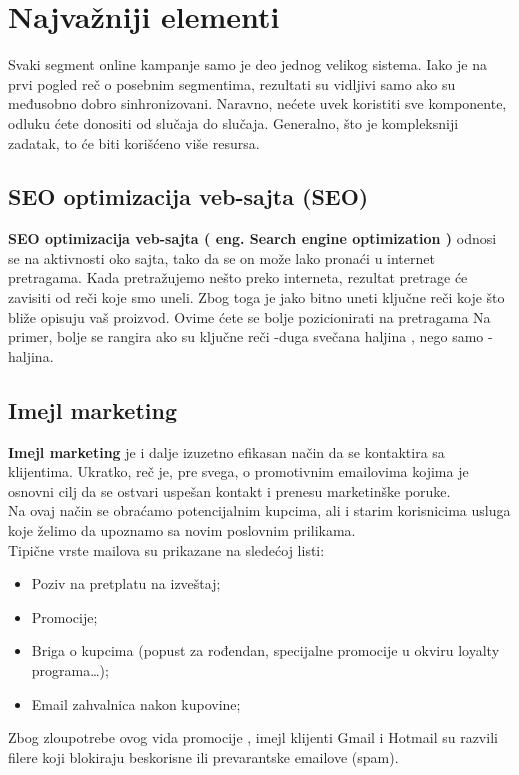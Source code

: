 \documentclass[a4paper]{article}
\begin{document}
{\section{Najvažniji elementi}
\label{sec:najvažniji elementi}
Svaki segment online kampanje samo je deo jednog velikog sistema. Iako je na prvi pogled reč o posebnim segmentima, rezultati su vidljivi samo ako su međusobno dobro sinhronizovani. Naravno, nećete uvek koristiti sve komponente, odluku ćete donositi od slučaja do slučaja. Generalno, što je kompleksniji zadatak, to će biti korišćeno više resursa.
\subsection{SEO optimizacija veb-sajta (SEO)}
\label{subsec:SEO}
\textbf {SEO optimizacija veb-sajta  ( eng. Search engine optimization )} odnosi se na aktivnosti oko sajta, tako da se on može lako pronaći u internet pretragama. Kada pretražujemo nešto preko interneta, rezultat pretrage će zavisiti od reči koje smo uneli. Zbog toga je jako bitno uneti ključne reči koje što bliže opisuju vaš proizvod. Ovime ćete se bolje pozicionirati na pretragama
Na primer, bolje se rangira ako su ključne reči -duga svečana haljina  , nego samo -haljina.
\subsection{Imejl marketing}
\label{subsec:Imejl}
 \textbf{Imejl marketing} je i dalje izuzetno efikasan način da se kontaktira sa klijentima. Ukratko, reč je, pre svega, o promotivnim emailovima kojima je osnovni cilj da se ostvari uspešan kontakt i prenesu marketinške poruke.
\\Na ovaj način se obraćamo potencijalnim kupcima, ali i starim korisnicima usluga koje želimo da upoznamo sa novim poslovnim prilikama.
\\Tipične vrste mailova su prikazane na sledećoj listi: 
\begin{itemize}
    \item Poziv na pretplatu na izveštaj;
    \item Promocije;
    \item Briga o kupcima (popust za rođendan, specijalne promocije u okviru loyalty programa…);
    \item Email zahvalnica nakon kupovine;
    \label{item:email}
\end{itemize}
Zbog zloupotrebe ovog vida promocije , imejl klijenti  Gmail i Hotmail su razvili filere koji  blokiraju beskorisne ili prevarantske emailove (spam).
}
\end{document}
